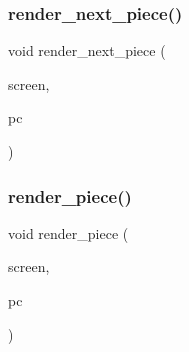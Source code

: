 \mbox{\label{render_8h_af45e8be6206218b6ce90c1cd10e5af05}} 
\subsubsection{render\+\_\+next\+\_\+piece()}
{\footnotesize\ttfamily void render\+\_\+next\+\_\+piece (\begin{DoxyParamCaption}\item[{S\+D\+L\+\_\+\+Surface $\ast$}]{screen,  }\item[{struct \textbf{ piece}}]{pc }\end{DoxyParamCaption})}

\mbox{\label{render_8h_a279af1bf532d87bb3e19de4ac662e47b}} 
\subsubsection{render\+\_\+piece()}
{\footnotesize\ttfamily void render\+\_\+piece (\begin{DoxyParamCaption}\item[{S\+D\+L\+\_\+\+Surface $\ast$}]{screen,  }\item[{struct \textbf{ piece}}]{pc }\end{DoxyParamCaption})}

